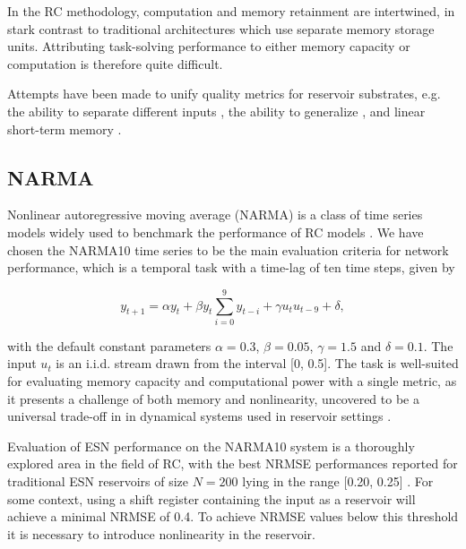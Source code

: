 In the RC methodology, computation and memory retainment are intertwined, in
stark contrast to traditional architectures which use separate memory storage
units. Attributing task-solving performance to either memory capacity or
computation is therefore quite difficult.

Attempts have been made to unify quality metrics for reservoir substrates,
e.g. the ability to separate different inputs \cite{legenstein_edge_2007}, the
ability to generalize \cite{legenstein_edge_2007}, and linear short-term memory
\cite{jaeger_short_2002}.

\subsection{NARMA}

Nonlinear autoregressive moving average (NARMA) is a class of time series models
widely used to benchmark the performance of RC models \cite{atiya_new_2000,
kubota_dynamical_2019}. We have chosen the NARMA10 time series to be the main
evaluation criteria for network performance, which is a temporal task with a
time-lag of ten time steps, given by

\begin{equation}
  y_{t+1} = \alpha y_{t} +
  \beta y_{t} \sum_{i=0}^{9}y_{t-i} +
  \gamma u_{t}u_{t-9} +
  \delta,
  \label{narma}
\end{equation}

\noindent with the default constant parameters $\alpha = 0.3$, $\beta = 0.05$,
$\gamma = 1.5$ and $\delta = 0.1$. The input $u_{t}$ is an i.i.d. stream drawn
from the interval [0, 0.5]. The task is well-suited for evaluating memory
capacity and computational power with a single metric, as it presents a
challenge of both memory and nonlinearity, uncovered to be a universal trade-off
in in dynamical systems used in reservoir settings
\cite{dambre_information_2012, verstraeten_memory_2010}.

Evaluation of ESN performance on the NARMA10 system is a thoroughly explored
area in the field of RC, with the best NRMSE performances reported for
traditional ESN reservoirs of size $N = 200$ lying in the range [0.20, 0.25]
\cite{goudarzi_comparative_2014, rodan_minimum_2011,
verstraeten_experimental_2007, jaeger_adaptive_nodate}. For some context, using
a shift register containing the input as a reservoir will achieve a minimal
NRMSE of 0.4. To achieve NRMSE values below this threshold it is necessary to
introduce nonlinearity in the reservoir.


